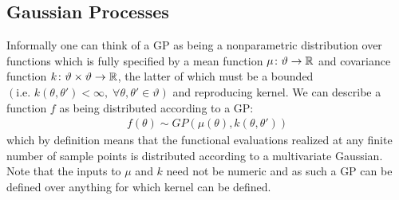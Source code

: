 
\subsection{Gaussian Processes}
\label{sec:opt:GPs}

Informally one can think of a GP \citep{rasmussen2006gaussian} as being a nonparametric distribution over functions which is fully specified by a mean function $\mu \colon \vartheta \rightarrow \mathbb{R}$ and covariance function $k \colon \vartheta \times \vartheta \rightarrow \mathbb{R}$, the latter of which must be a bounded $\left(\text{i.e. }k\left(\theta,\theta'\right)<\infty, \; \forall \theta,\theta' \in \vartheta\right)$ and reproducing kernel.  We can describe a function $f$ as being distributed according to a GP:
\begin{align}
\label{eq:GP}
f \left(\theta\right) \sim GP \left(\mu\left(\theta\right), k\left(\theta,\theta'\right)\right)
\end{align}
which by definition means that the functional evaluations realized at any finite number of sample points is distributed according to a multivariate Gaussian. Note that the inputs to $\mu$ and $k$ need not be numeric and as such a GP can be defined over anything for which kernel can be defined.

